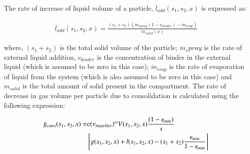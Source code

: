 \documentclass[preprint,11pt,authoryear]{elsarticle}
\begin{document}


%	
%	    
%	    
%	    

The rate of increase of liquid volume of a particle, $\dot{l}_{add}(s_1,s_2,x)$ is expressed as:

\begin{align}
\dot{l}_{add}(s_1,s_2,x) = \frac{(s_1+s_2)(\dot{m}_{spray}(1-c_{binder})-\dot{m}_{evap})}{m_{solid}(x)}
\end{align}

where, $(s_1+s_2)$  is the total solid volume of the particle; $\dot{m}_spray$ is the rate of external 
liquid addition, $c_{binder}$ is the concentration of binder in the external liquid (which is assumed to 
be zero in this case); $\dot{m}_{evap}$ is the rate of evaporation of liquid from 
the system (which is also assumed to be zero in this case) and $m_{solid}$ is the total amount of solid 
present in the compartment.
The rate of decrease in gas volume per particle due to consolidation is calculated using the 
following expression: \citep{Verkoeijen2002} 

\begin{align}
\dot{g}_{cons}(s_1,s_2,x)=&c (\nu_{impeller})^{\omega}V(s_1,s_2,x)\frac{(1-\epsilon_{min})}{s} 
\notag \\ 
& \left[g(s_1,s_2,x)+l(s_1,s_2,x) -(s_1+s_2)\frac{\epsilon_{min}}{1-\epsilon_{min}}\right]
\end{align}        
\end{document}
